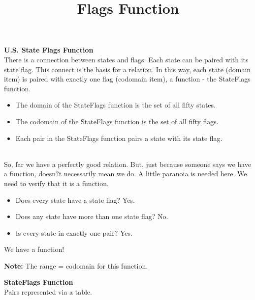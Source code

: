 \documentclass{ximera}
\title{Flags Function}
\begin{document}
\begin{abstract}
\end{abstract}

\maketitle




\textbf{U.S. State Flags Function} \\

There is a connection between states and flags.  Each state can be paired with its state flag.  This connect is the basis for a relation.
In this way, each state (domain item) is paired with exactly one flag (codomain item), a function - the StateFlags function.


\begin{definition} 
\begin{itemize}
\item The domain of the StateFlags function is the set of all fifty states.
\item The codomain of the StateFlags function is the set of all fifty flags.
\item Each pair in the StateFlags function pairs a state with its state flag.
\end{itemize}
\end{definition}
\quad \\

So, far we have a perfectly good relation. But, just because someone says we have a function, doesn?t necessarily mean we do.  A little paranoia is needed here. We need to verify that it is a function.

\begin{itemize}
\item Does every state have a state flag?  Yes.
\item Does any state have more than one state flag?  No.
\item Is every state in exactly one pair?  Yes.
\end{itemize}


We have a function! 

\textbf{Note:}  The range = codomain for this function.
\quad \\



\begin{center}
\textbf{StateFlags Function} \\
Pairs represented via a table.
\end{center}
\end{document}
